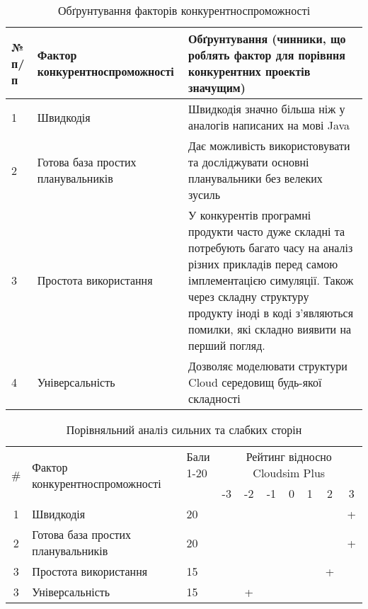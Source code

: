 \begin{table}[H]
	\caption{Обґрунтування факторів конкурентноспроможності}
	\begin{tabular}
		{|l|p{7cm}|p{7cm}|} \hline
		№ п/п
		& Фактор конкурентноспроможності
		& Обґрунтування (чинники, що роблять фактор для порівння конкурентних проектів значущим)
		\\ \hline
		
		1
		& Швидкодія
		& Швидкодія значно більша ніж у аналогів написаних на мові Java
		\\ \hline
		
		2
		& Готова база простих планувальників
		& Дає можливість використовувати та досліджувати основні планувальники без велеких зусиль
		\\ \hline
		
		3
		& Простота використання
		& У конкурентів програмні продукти часто дуже складні та потребують багато часу на аналіз різних прикладів перед самою імплементацією симуляції. Також через складну структуру продукту іноді в коді з'являються помилки, які складно виявити на перший погляд.
		\\ \hline
		
		4
		& Універсальність
		& Дозволяє моделювати структури Cloud середовищ будь-якої складності
		
		\\ \hline
	\end{tabular}
\end{table}


\begin{table}[H]
	\caption{Порівняльний аналіз сильних та слабких сторін}
	\centering
	\begin{tabular}{|c|p{8cm}|p{1cm}|c|c|c|c|c|c|c|}
		\hline
		\multirow{2}{*}{\#} & \multirow{2}{*}{Фактор конкурентноспроможності}                 & \multirowcell{2}{Бали\\ 1-20} & \multicolumn{7}{p{3cm}|}{ \centering Рейтинг відносно Cloudsim Plus} \\ \cline{4-10}
		
							&                                              					  &                            &  -3 & -2  & -1  & 0 & 1 & 2 & 3 \\ \hline
		1                   & Швидкодія								            			  & 20                         &     &     &     &   &   &   & + \\ \hline
		2                   & Готова база простих планувальників                              & 20                         &     &     &     &   &   &   & + \\ \hline
		3                   & Простота використання           								  & 15                         &     &     &     &   &   & + &   \\ \hline
		3                   & Універсальність										          & 15                         &     &  +  &     &   &   &   &   \\ \hline
	\end{tabular}
\end{table}

